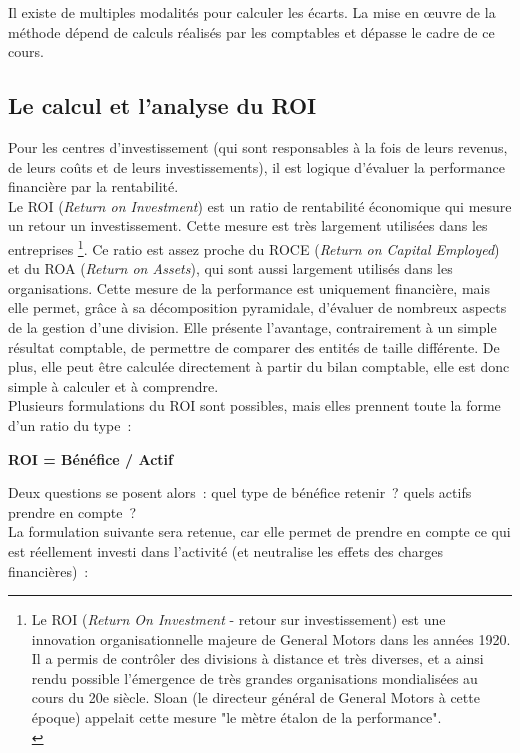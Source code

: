 \documentclass{kaobook}
\begin{document}
\begin{warning}
Il existe de multiples modalités pour calculer les écarts. La mise en œuvre de la méthode dépend de calculs réalisés par les comptables et dépasse le cadre de ce cours.\\
\end{warning}
\subsection{Le calcul et l'analyse du ROI}
\label{sec:org6f236b5}
Pour les centres d'investissement (qui sont responsables à la fois de leurs revenus, de leurs coûts et de leurs investissements), il est logique d'évaluer la performance financière par la rentabilité.\\
Le ROI (\emph{Return on Investment}) est un ratio de rentabilité économique qui mesure un retour un investissement. Cette mesure est très largement utilisées dans les entreprises \footnote{Le ROI (\emph{Return On Investment} - retour sur investissement) est une innovation organisationnelle majeure de General Motors dans les années 1920. Il a permis de contrôler des divisions à distance et très diverses, et a ainsi rendu possible l'émergence de très grandes organisations mondialisées au cours du 20e siècle. Sloan (le directeur général de General Motors à cette époque) appelait cette mesure "le mètre étalon de la performance".\\}. Ce ratio est assez proche du ROCE (\emph{Return on Capital Employed}) et du ROA (\emph{Return on Assets}), qui sont aussi largement utilisés dans les organisations. Cette mesure de la performance est uniquement financière, mais elle permet, grâce à sa décomposition pyramidale, d'évaluer de nombreux aspects de la gestion d'une division. Elle présente l'avantage, contrairement à un simple résultat comptable, de permettre de comparer des entités de taille différente. De plus, elle peut être calculée directement à partir du bilan comptable, elle est donc simple à calculer et à comprendre.\\
Plusieurs formulations du ROI sont possibles, mais elles prennent toute la forme d'un ratio du type :\\
\begin{center}
\textbf{ROI = Bénéfice / Actif}\\
\end{center}
Deux questions se posent alors : quel type de bénéfice retenir ? quels actifs prendre en compte ?\\
La formulation suivante sera retenue, car elle permet de prendre en compte ce qui est réellement investi dans l'activité (et neutralise les effets des charges financières) :\\
\end{document}
